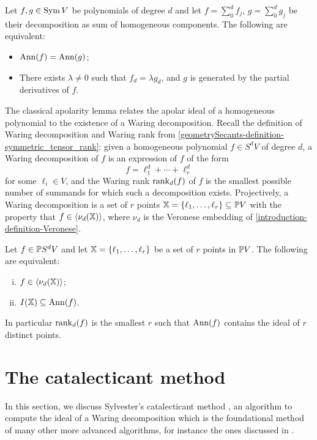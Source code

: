 \begin{proposition}
 Let $f,g \in \operatorname{Sym} V$ be polynomials of degree $d$ and let $f = \sum_0^d f_j$, $g = \sum_0^d g_j$ be their decomposition as sum of homogeneous components. The following are equivalent:
 \begin{itemize}
  \item $\operatorname{Ann}(f) = \operatorname{Ann}(g)$;
  \item There exists $\lambda \neq 0$ such that $f_d = \lambda g_d$, and $g$ is generated by the partial derivatives of $f$.
 \end{itemize}
\end{proposition}

The classical apolarity lemma relates the apolar ideal of a homogeneous polynomial to the existence of a Waring decomposition. Recall the definition of Waring decomposition and Waring rank from \ref{geometrySecants-definition-symmetric_tensor_rank}: given a homogeneous polynomial $f \in S^d V$ of degree $d$, a Waring decomposition of $f$ is an expression of $f$ of the form 
\[
f = \ell_1^d + \cdots + \ell_r^d
\]
for some $\ell_i \in V$, and the Waring rank $\mathrm{rank}_d(f)$ of $f$ is the smallest possible number of summands for which such a decomposition exists. Projectively, a Waring decomposition is a set of $r$ points $\mathbb{X} = \{ \ell_1 , \ldots , \ell_r \} \subseteq \mathbb{P} V$ with the property that $f \in \langle \nu_d(\mathbb{X}) \rangle$, where $\nu_d$ is the Veronese embedding of \ref{introduction-definition-Veronese}. 

\begin{lemma}
 \label{tensorRank-lemma-apolarityLemma}
 Let $f \in \mathbb{P} S^d V$ and let $\mathbb{X} = \{ \ell_1 , \ldots , \ell_r\}$ be a set of $r$ points in $\mathbb{P} V$. The following are equivalent:
 \begin{enumerate}[(i)]
  \item $f \in \langle \nu_d(\mathbb{X}) \rangle$;
  \item $I(\mathbb{X}) \subseteq \operatorname{Ann}(f)$.
 \end{enumerate}
 In particular $\mathrm{rank}_d(f)$ is the smallest $r$ such that $\operatorname{Ann}(f)$ contains the ideal of $r$ distinct points.
\end{lemma}



\section{The catalecticant method}
\label{tensorRank-section-catalecticant}
In this section, we discuss Sylvester's catalecticant method \cite{Syl52,IK99}, an algorithm to compute the ideal of a Waring decomposition which is the foundational method of many other more advanced algorithms, for instance the ones discussed in \cite{BCMT10,BBCM13,BT20,LMR23}.

